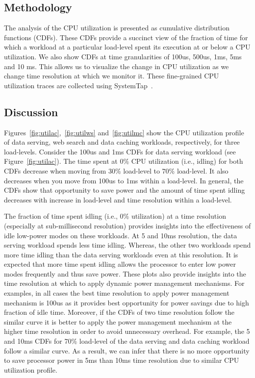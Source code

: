 \documentclass{sig-alternate}
\begin{document}
\subsection{Methodology}

The analysis of the CPU utilization is presented as cumulative 
distribution functions (CDFs). These CDFs provide a succinct view of the 
fraction of time for which a workload at a 
particular load-level spent its execution at or below a CPU utilization. 
We also show CDFs at  time granularities of 
100us, 500us, 1ms, 5ms and 10 ms. This allows us to visualize the change in 
CPU utilization as we change time resolution at which we monitor it. 
These fine-grained CPU utilization traces are collected using SystemTap~\cite{systemtap}.

\subsection{Discussion}

Figures~\ref{fig:utilac},~\ref{fig:utilws} and~\ref{fig:utilmc} show the 
CPU utilization profile of data serving, web search and data caching workloads, 
respectively, for three load-levels. Consider the 100us and 1ms CDFs 
for data serving workload (see 
Figure~\ref{fig:utilac}). The time spent at 0\% CPU utilization (i.e., idling) for both CDFs 
decrease when moving from 30\% load-level to 70\% load-level. It also 
decreases when you move from 100us to 1ms within a load-level. In general, 
the CDFs show that opportunity to save power and the amount of time spent 
idling decreases with increase in load-level and time resolution 
within a load-level. 

The fraction of time 
spent idling (i.e., 0\% utilization) at a time resolution (especially at 
sub-millisecond resolution) provides insights into the 
effectiveness of idle low-power modes on these workloads. At 5 and 10ms resolution, the data serving workload 
spends less time idling. Whereas, the other two workloads spend more time idling than the 
data serving workloads even at this resolution. It is expected 
that more time spent idling allows the processor to enter low power modes 
frequently and thus save power. These plots also provide insights into the time 
resolution at which to apply dynamic power management mechanisms. For examples, 
in all cases the best time resolution to apply power management mechanism is 100us 
as it provides best opportunity for power savings due to high fraction of idle time. 
Moreover, if the CDFs of two time resolution follow the similar curve 
it is better to  apply the power management mechanism  at the higher time 
resolution in order to avoid unnecessary overhead. For example, the 5 and 
10ms CDFs for 70\% load-level of the data serving and data caching workload follow a
similar curve. As a result, we can infer that there is no more opportunity to save 
processor power in 5ms than 10ms time resolution due to similar CPU utilization profile.
\end{document}
